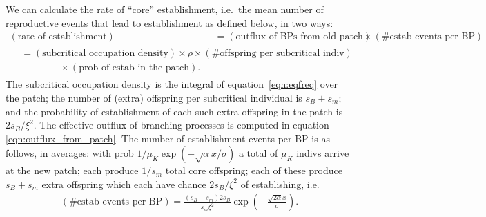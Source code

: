 \documentclass{article}
\begin{document}
We can calculate the rate of ``core'' establishment, i.e.\ the mean number of reproductive events that lead to establishment as defined below, in two ways:
\begin{align}
    (\mbox{rate of establishment}) &= (\mbox{outflux of BPs from old patch}) \times (\mbox{\# estab events per BP}) \label{eqn:heuristic1a} \\
    \begin{split} &= (\mbox{subcritical occupation density}) \times \rho \times (\mbox{\# offspring per subcritical indiv}) \label{eqn:heuristic1b} \\
    & \qquad \qquad \times (\mbox{prob of estab in the patch}) . \end{split} 
\end{align}
The subcritical occupation density is the integral of equation~\eqref{eqn:eqfreq} over the patch;
the number of (extra) offspring per subcritical individual is $s_B+s_m$;
and the probability of establishment of each such extra offspring in the patch is $2s_B/\xi^2$.
The effective outflux of branching processes is computed in equation \eqref{eqn:outflux_from_patch}.
The number of establishment events per BP is as follows, in averages: 
with prob $1/\mu_K \exp(-\sqrt{\alpha} x/ \sigma)$ a total of $\mu_K$ indivs arrive at the new patch; 
each produce $1/s_m$ total core offspring;
each of these produce $s_B+s_m$ extra offspring which each have chance $2s_B/\xi^2$ of establishing,
i.e.
\begin{align}
  (\mbox{\# estab events per BP}) = \frac{(s_B+s_m) 2 s_B }{ s_m \xi^2 } \exp\left(-\frac{\sqrt{2\alpha} x}{\sigma}\right) .
\end{align}
\end{document}
